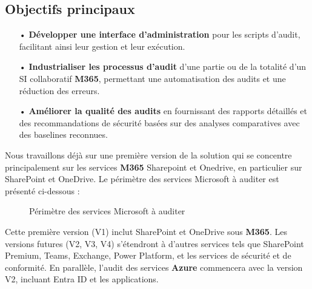 \subsection{Objectifs principaux}
\begin{itemize}
    \item[•] \textbf{Développer une interface d'administration} pour les scripts d'audit, facilitant ainsi leur gestion et leur exécution.
    \item[•] \textbf{Industrialiser les processus d'audit} d'une partie ou de la totalité d'un SI collaboratif \textbf{M365}, permettant une automatisation des audits et une réduction des erreurs.
    \item[•] \textbf{Améliorer la qualité des audits} en fournissant des rapports détaillés et des recommandations de sécurité basées sur des analyses comparatives avec des baselines reconnues.
\end{itemize}

Nous travaillons déjà sur une première version de la solution qui se concentre principalement sur les services \textbf{M365} Sharepoint et Onedrive, en particulier sur SharePoint et OneDrive. Le périmètre des services Microsoft à auditer est présenté ci-dessous :

\begin{figure}[H]
    \begin{center}
        \caption{Périmètre des services Microsoft à auditer}
    \end{center}
\end{figure}

Cette première version (V1) inclut SharePoint et OneDrive sous \textbf{M365}. Les versions futures (V2, V3, V4) s'étendront à d'autres services tels que SharePoint Premium, Teams, Exchange, Power Platform, et les services de sécurité et de conformité. En parallèle, l'audit des services \textbf{Azure} commencera avec la version V2, incluant Entra ID et les applications.

